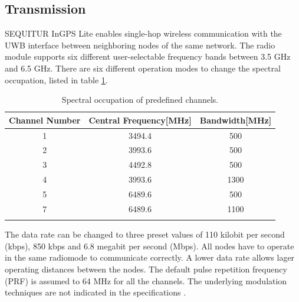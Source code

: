 \subsection{Transmission}
SEQUITUR InGPS Lite enables single-hop wireless communication with the UWB interface between neighboring nodes of the same network. 
The radio module supports six different user-selectable frequency bands between 3.5 GHz and 6.5 GHz. There are six different operation modes to change the spectral occupation, listed in table \ref{tab:spectral_occupation}.\\
\begin{table}
\caption{Spectral occupation of predefined channels.}
\label{tab:spectral_occupation}
\centering
\begin{tabular}{c c c}
\toprule
\textbf{Channel Number} & \textbf{Central Frequency}[MHz] & \textbf{Bandwidth}[MHz]\\
\midrule
1 & 3494.4 & 500\\
2 & 3993.6 & 500\\
3 & 4492.8 & 500\\
4 & 3993.6 & 1300\\
5 & 6489.6 & 500\\
7 & 6489.6 & 1100\\
\bottomrule\\
\end{tabular}
\end{table}
The data rate can be changed to three preset values of 110 kilobit per second (kbps), 850 kbps and 6.8 megabit per second (Mbps). All nodes have to operate in the same radiomode to communicate correctly. A lower data rate allows lager operating distances between the nodes. 
The default pulse repetition frequency (PRF) is assumed to 64 MHz for all the channels.
The underlying modulation techniques are not indicated in the specifications \cite{Usermanual} \cite{Beginnersguide}.

